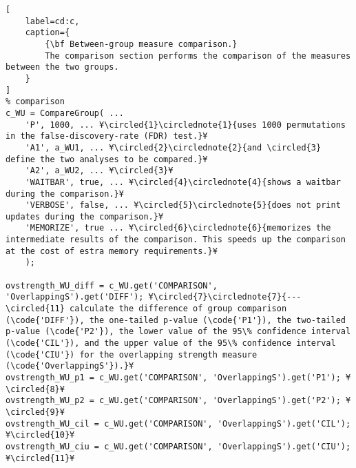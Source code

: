 \documentclass{tufte-handout}
\begin{document}
\begin{lstlisting}[
	label=cd:c,
	caption={
		{\bf Between-group measure comparison.}
		The comparison section performs the comparison of the measures between the two groups.
	}
]
% comparison
c_WU = CompareGroup( ...
    'P', 1000, ... ¥\circled{1}\circlednote{1}{uses 1000 permutations in the false-discovery-rate (FDR) test.}¥
    'A1', a_WU1, ... ¥\circled{2}\circlednote{2}{and \circled{3} define the two analyses to be compared.}¥
    'A2', a_WU2, ... ¥\circled{3}¥
    'WAITBAR', true, ... ¥\circled{4}\circlednote{4}{shows a waitbar during the comparison.}¥
    'VERBOSE', false, ... ¥\circled{5}\circlednote{5}{does not print updates during the comparison.}¥
    'MEMORIZE', true ... ¥\circled{6}\circlednote{6}{memorizes the intermediate results of the comparison. This speeds up the comparison at the cost of estra memory requirements.}¥
    );

ovstrength_WU_diff = c_WU.get('COMPARISON', 'OverlappingS').get('DIFF'); ¥\circled{7}\circlednote{7}{--- \circled{11} calculate the difference of group comparison (\code{'DIFF'}), the one-tailed p-value (\code{'P1'}), the two-tailed p-value (\code{'P2'}), the lower value of the 95\% confidence interval (\code{'CIL'}), and the upper value of the 95\% confidence interval (\code{'CIU'}) for the overlapping strength measure (\code{'OverlappingS'}).}¥
ovstrength_WU_p1 = c_WU.get('COMPARISON', 'OverlappingS').get('P1'); ¥\circled{8}¥
ovstrength_WU_p2 = c_WU.get('COMPARISON', 'OverlappingS').get('P2'); ¥\circled{9}¥
ovstrength_WU_cil = c_WU.get('COMPARISON', 'OverlappingS').get('CIL'); ¥\circled{10}¥
ovstrength_WU_ciu = c_WU.get('COMPARISON', 'OverlappingS').get('CIU'); ¥\circled{11}¥
\end{lstlisting}
\end{document}

